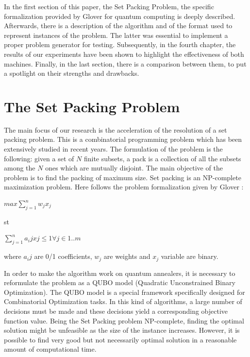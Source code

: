\documentclass[oneside,a4paper]{article}
\begin{document}
In the first section of this paper, the Set Packing Problem, the specific formalization provided by Glover for quantum computing\cite{Website1} is deeply described. Afterwards, there is a description of the algorithm and of the format used to represent instances of the problem. The latter was essential to implement a proper problem generator for testing. Subsequently, in the fourth chapter, the results of our experiments have been shown to highlight the effectiveness of both machines. Finally, in the last section, there is a comparison between them, to put a spotlight on their strengths and drawbacks.

\section{The Set Packing Problem}


The main focus of our research is the acceleration of the resolution of a set packing problem. This is a combinatorial programming problem which has been extensively studied in recent years\cite{article3}. The formulation of the problem is the following: given a set of $N$ finite subsets, a pack is a collection of all the subsets among the $N$ ones which are mutually disjoint. The main objective of the problem is to find the packing of maximum size\cite{article2}. Set packing is an NP-complete maximization problem. Here follows the problem formalization given by Glover \cite{article1}:


\centerline{${ max {\sum_{j=1}^{n}w_jx_j}}$}
\centerline{
st
}

\centerline{${\sum_{j=1}^{n}a_ijxj \leq 1 \forall j \in 1..m}$}

\setlength\parindent{0pt}where ${a_ij}$ are 0/1 coefficients, ${w_j}$ are weights and ${x_j}$ variable are binary.



\setlength\parindent{10pt}In order to make the algorithm work on quantum annealers, it is necessary to reformulate the problem as a QUBO model (Quadratic Unconstrained Binary Optimization). The QUBO model is a special framework specifically designed for Combinatorial Optimization tasks. In this kind of algorithms, a large number of decisions must be made and these decisions yield a corresponding objective function value. Being the Set Packing problem NP-complete, finding the optimal solution might be unfeasible as the size of the instance increases. However, it is possible to find very good but not necessarily optimal solution in a reasonable amount of computational time.
\end{document}
